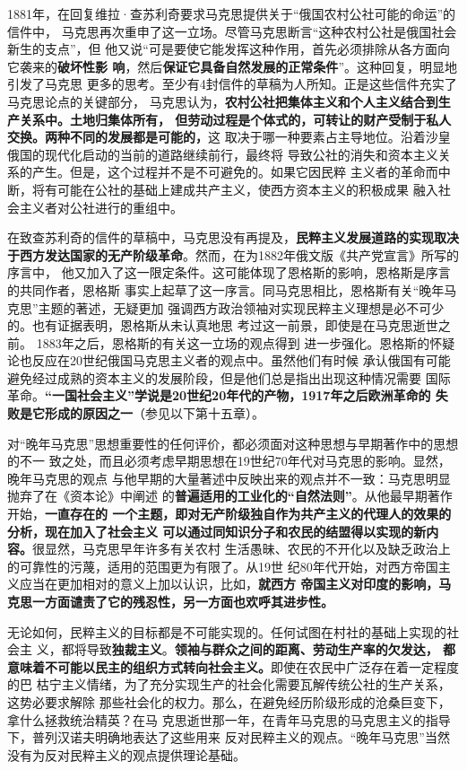1881年，在回复维拉·查苏利奇要求马克思提供关于“俄国农村公社可能的命运”的信件中，
马克思再次重申了这一立场。尽管马克思断言“这种农村公社是俄国社会新生的支点”，但
他又说“可是要使它能发挥这种作用，首先必须排除从各方面向它袭来的\textbf{破坏性影
  响}，然后\textbf{保证它具备自然发展的正常条件}”。这种回复，明显地引发了马克思
更多的思考。至少有4封信件的草稿为人所知。正是这些信件充实了马克思论点的关键部分，
马克思认为，\textbf{农村公社把集体主义和个人主义结合到生产关系中。土地归集体所有，
  但劳动过程是个体式的，可转让的财产受制于私人交换。两种不同的发展都是可能的，}这
取决于哪一种要素占主导地位。沿着沙皇俄国的现代化启动的当前的道路继续前行，最终将
导致公社的消失和资本主义关系的产生。但是，这个过程并不是不可避免的。如果它因民粹
主义者的革命而中断，将有可能在公社的基础上建成共产主义，使西方资本主义的积极成果
融入社会主义者对公社进行的重组中。

在致查苏利奇的信件的草稿中，马克思没有再提及，\textbf{民粹主义发展道路的实现取决
  于西方发达国家的无产阶级革命}。然而，在为1882年俄文版《共产党宣言》所写的序言中，
他又加入了这一限定条件。这可能体现了恩格斯的影响，恩格斯是序言的共同作者，恩格斯
事实上起草了这一序言。同马克思相比，恩格斯有关“晚年马克思”主题的著述，无疑更加
强调西方政治领袖对实现民粹主义理想是必不可少的。也有证据表明，恩格斯从未认真地思
考过这一前景，即使是在马克思逝世之前。 1883年之后，恩格斯的有关这一立场的观点得到
进一步强化。恩格斯的怀疑论也反应在20世纪俄国马克思主义者的观点中。虽然他们有时候
承认俄国有可能避免经过成熟的资本主义的发展阶段，但是他们总是指出出现这种情况需要
国际革命。\textbf{“一国社会主义”学说是20世纪20年代的产物，1917年之后欧洲革命的
  失败是它形成的原因之一}（参见以下第十五章）。

对“晚年马克思”思想重要性的任何评价，都必须面对这种思想与早期著作中的思想的不一
致之处，而且必须考虑早期思想在19世纪70年代对马克思的影响。显然，晚年马克思的观点
与他早期的大量著述中反映出来的观点并不一致：马克思明显抛弃了在《资本论》中阐述
的\textbf{普遍适用的工业化的“自然法则”}。从他最早期著作开始，\textbf{一直存在的
  一个主题，即对无产阶级独自作为共产主义的代理人的效果的分析，现在加入了社会主义
  可以通过同知识分子和农民的结盟得以实现的新内容。}很显然，马克思早年许多有关农村
生活愚昧、农民的不开化以及缺乏政治上的可靠性的污蔑，适用的范围更为有限了。从19世
纪80年代开始，对西方帝国主义应当在更加相对的意义上加以认识，比如，\textbf{就西方
  帝国主义对印度的影响，马克思一方面谴责了它的残忍性，另一方面也欢呼其进步性。}

无论如何，民粹主义的目标都是不可能实现的。任何试图在村社的基础上实现的社会主
义，都将导致\textbf{独裁主义}。\textbf{领袖与群众之间的距离、劳动生产率的欠发达，
  都意味着不可能以民主的组织方式转向社会主义。}即使在农民中广泛存在着一定程度的巴
枯宁主义情绪，为了充分实现生产的社会化需要瓦解传统公社的生产关系，这势必要求解除
那些社会化的权力。那么，在避免经历阶级形成的沧桑巨变下，拿什么拯救统治精英？在马
克思逝世那一年，在青年马克思的马克思主义的指导下，普列汉诺夫明确地表达了这些用来
反对民粹主义的观点。“晚年马克思”当然没有为反对民粹主义的观点提供理论基础。

